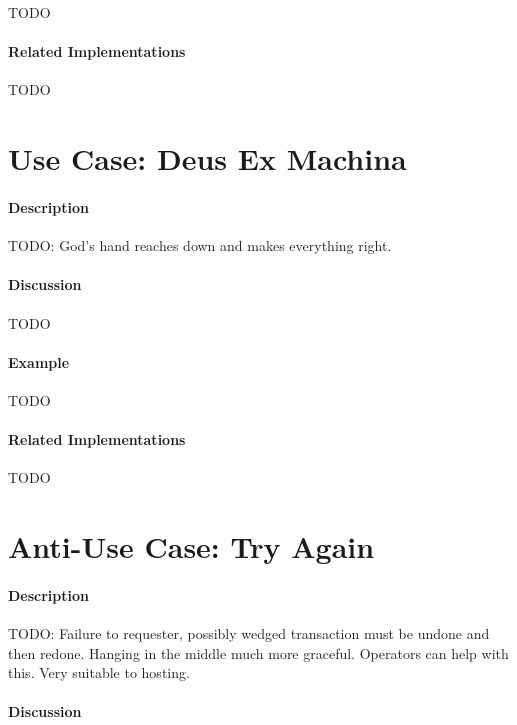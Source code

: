 {\Large TODO}

\paragraph{Related Implementations}

{\Large TODO}

\section{Use Case: Deus Ex Machina}

\paragraph{Description}

{\Large TODO:} God's hand reaches down and makes everything right.

\paragraph{Discussion}

{\Large TODO}

\paragraph{Example}

{\Large TODO}

\paragraph{Related Implementations}

{\Large TODO}

\section{Anti-Use Case: Try Again}

\paragraph{Description}

{\Large TODO:} Failure to requester, possibly wedged transaction must be undone and then redone.  Hanging in the middle much more graceful.  Operators can help with this.  Very suitable to hosting.

\paragraph{Discussion}

